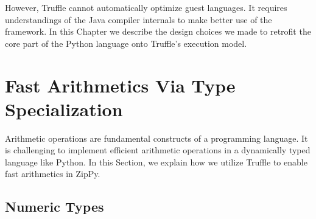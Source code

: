 However, Truffle cannot automatically optimize guest languages.
It requires understandings of the Java compiler internals to make better use of the framework.
In this Chapter we describe the design choices we made to retrofit the core part of the Python language onto Truffle's execution model.

\section{Fast Arithmetics Via Type Specialization}
\label{sec:ch3-fast-arithmetics}

Arithmetic operations are fundamental constructs of a programming language.
It is challenging to implement efficient arithmetic operations in a dynamically typed language like Python.
In this Section, we explain how we utilize Truffle to enable fast arithmetics in ZipPy.

\subsection{Numeric Types}
\label{sec:numeric-types}

